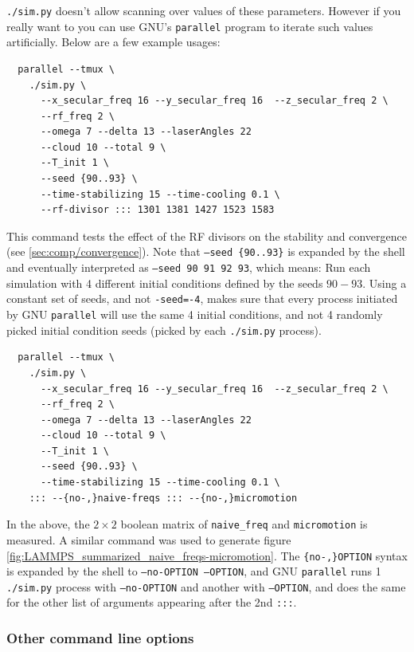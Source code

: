 \texttt{./sim.py} doesn't allow scanning over values of these parameters. However if you really want to you can use GNU's \texttt{parallel}\cite{GNUParallel} program to iterate such values artificially. Below are a few example usages:

\begin{verbatim}
  parallel --tmux \
    ./sim.py \
      --x_secular_freq 16 --y_secular_freq 16  --z_secular_freq 2 \
      --rf_freq 2 \
      --omega 7 --delta 13 --laserAngles 22 
      --cloud 10 --total 9 \
      --T_init 1 \
      --seed {90..93} \
      --time-stabilizing 15 --time-cooling 0.1 \
      --rf-divisor ::: 1301 1381 1427 1523 1583
\end{verbatim}

This command tests the effect of the RF divisors on the stability and convergence (see \ref{sec:comp/convergence}). Note that \texttt{--seed \{90..93\}} is expanded by the shell and eventually interpreted as \texttt{--seed 90 91 92 93}, which means: Run each simulation with 4 different initial conditions defined by the seeds $90-93$. Using a constant set of seeds, and not \texttt{-seed=-4}, makes sure that every process initiated by GNU \texttt{parallel} will use the same 4 initial conditions, and not 4 randomly picked initial condition seeds (picked by each \texttt{./sim.py} process).

\begin{verbatim}
  parallel --tmux \
    ./sim.py \
      --x_secular_freq 16 --y_secular_freq 16  --z_secular_freq 2 \
      --rf_freq 2 \
      --omega 7 --delta 13 --laserAngles 22 
      --cloud 10 --total 9 \
      --T_init 1 \
      --seed {90..93} \
      --time-stabilizing 15 --time-cooling 0.1 \
    ::: --{no-,}naive-freqs ::: --{no-,}micromotion
\end{verbatim}

In the above, the $2\times 2$ boolean matrix of \texttt{naive\_freq} and \texttt{micromotion} is measured. A similar command was used to generate figure \ref{fig:LAMMPS_summarized_naive_freqs-micromotion}. The \texttt{\{no-,\}OPTION} syntax is expanded by the shell to \texttt{--no-OPTION --OPTION}, and GNU \texttt{parallel} runs 1 \texttt{./sim.py} process with \texttt{--no-OPTION} and another with \texttt{--OPTION}, and does the same for the other list of arguments appearing after the 2nd \texttt{:::}.

\subsubsection{Other command line options}

